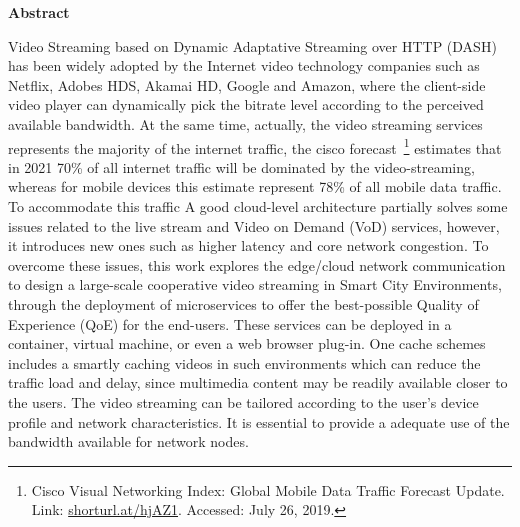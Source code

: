 \begin{center}
	{\bf Abstract}
\end{center}

Video Streaming based on Dynamic Adaptative Streaming over HTTP (DASH) has been widely adopted by the Internet video technology companies such as Netflix, Adobes HDS, Akamai HD, Google and Amazon, where the client-side video player can dynamically pick the bitrate level according to the perceived available bandwidth. 
At the same time, actually, the video streaming services represents the majority of the internet traffic, the cisco forecast~\footnote{Cisco Visual Networking Index: Global Mobile Data Traffic Forecast Update. Link: \url{shorturl.at/hjAZ1}. Accessed: July 26, 2019.} estimates that in 2021 70\% of all internet traffic will be dominated by the video-streaming, whereas for mobile devices this estimate represent 78\% of all mobile data traffic. To accommodate this traffic %
A good cloud-level architecture partially solves some issues related to the live stream and Video on Demand (VoD) services, however, it introduces new ones such as higher latency and core network congestion. 
To overcome these issues, this work explores the edge/cloud network communication to design a large-scale cooperative video streaming in Smart City Environments, through the deployment of microservices to offer the best-possible Quality of Experience (QoE) for the end-users. These services can be deployed in a container, virtual machine, or even a web browser plug-in. One cache schemes includes a smartly caching videos in such environments which can reduce the traffic load and delay, since multimedia content may be readily available closer to the users. The video streaming can be tailored according to the user's device profile and network characteristics. It is essential to provide a adequate use of the bandwidth available for network nodes. %

